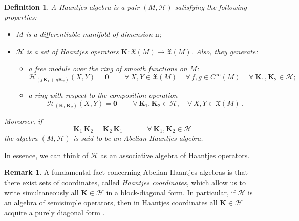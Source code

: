 \documentclass[10pt]{amsart}
\numberwithin{equation}{section}
\newtheorem{definition}{Definition}
\theoremstyle{definition}
\newtheorem{remark}{\textbf{Remark}}
\begin{document}
	\begin{definition}\label{def:HM}
		A Haantjes algebra is a pair $(M, \mathscr{H})$ satisfying the following properties:
		\begin{itemize}
			\item
			$M$ is a differentiable manifold of dimension $\mathrm{n}$;
			\item
			$ \mathscr{H}$ is a set of Haantjes operators $\boldsymbol{K}:\mathfrak{X}(M)\to \mathfrak{X}(M)$. Also, they generate:
			\begin{itemize}
				\item
				a free module over the ring of smooth functions on $M$:
				\begin{equation}
					\label{eq:Hmod}
					\mathcal{H}_{\left( f\boldsymbol{K}_{1} +
						g\boldsymbol{K}_2 \right)}(X,Y)= \mathbf{0}
					\, \qquad\forall\, X, Y \in \mathfrak{X}(M) \, \quad \forall\, f,g \in C^\infty(M)\,\quad \forall ~\boldsymbol{K}_1,\boldsymbol{K}_2 \in \mathscr{H};
				\end{equation}
				\item
				a ring with respect to the composition operation
				\begin{equation}
					\label{eq:Hring}
					\mathcal{H}_{(\boldsymbol{K}_1 \, \boldsymbol{K}_2)}(X,Y)=\mathbf{0} \, \qquad
					\forall\, \boldsymbol{K}_1,\boldsymbol{K}_2\in \mathscr{H}, \quad\forall\, X, Y \in \mathfrak{X}(M)\ .
				\end{equation}
			\end{itemize}
		\end{itemize}
		Moreover, if 
		\begin{equation}
			\boldsymbol{K}_1\,\boldsymbol{K}_2=\boldsymbol{K}_2\,\boldsymbol{K}_1 \, \quad\qquad\ \forall~\boldsymbol{K}_1,\boldsymbol{K}_2 \in \mathscr{H}\,
		\end{equation}
		the algebra $(M, \mathscr{H})$ is said to be an Abelian Haantjes algebra. 
	\end{definition}
	
	In essence, we can think of $\mathscr{H}$ as an associative algebra of Haantjes operators.
	
	\begin{remark}
		A fundamental fact concerning Abelian Haantjes algebras is that there exist sets of coordinates, called \textit{Haantjes coordinates}, which allow us to write simultaneously all $\boldsymbol{K}\in \mathscr{H}$ in a block-diagonal form. In particular, if $\mathscr{H}$ is an algebra of semisimple operators, then in Haantjes coordinates all $\boldsymbol{K}\in \mathscr{H}$ acquire a purely diagonal form \cite{TT2021JGP}. 
		
	\end{remark}
	
\end{document}
